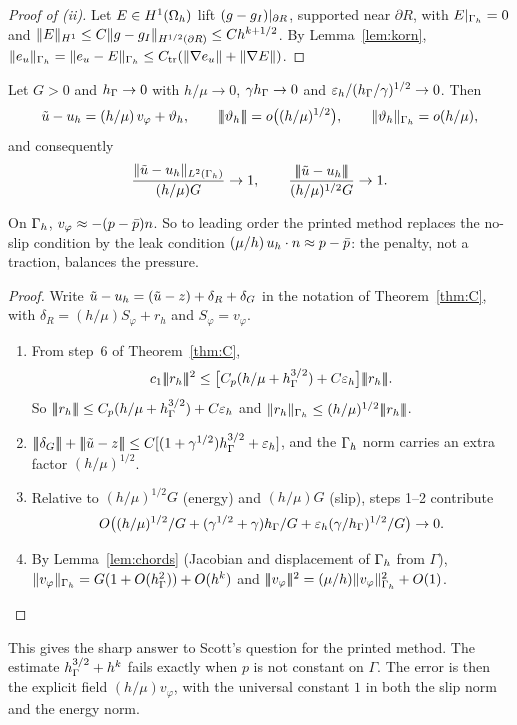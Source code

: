 \begin{proof}[Proof of (ii)]
Let $E\in H^1(\Omega_h)$ lift $(g-g_I)|_{\partial R}$, supported near $\partial R$, with $E|_{\Gamma_h}=0$ and $\lVert E\rVert_{H^1}\le C\lVert g-g_I\rVert_{H^{1/2}(\partial R)}\le Ch^{k+1/2}$. By Lemma~\ref{lem:korn}, $\lVert e_u\rVert_{\Gamma_h}=\lVert e_u-E\rVert_{\Gamma_h}\le C_{\mathrm{tr}}(\lVert \nabla e_u\rVert+\lVert \nabla E\rVert)$.
\end{proof}

\begin{corollary}\label{cor:Bp}
Let $G>0$ and $h_\Gamma\to0$ with $h/\mu\to0$, $\gamma h_\Gamma\to0$ and $\varepsilon_h/(h_\Gamma/\gamma)^{1/2}\to0$. Then
\[
\tilde u-u_h=(h/\mu)\,v_\varphi+\vartheta_h,\qquad |\!|\!|\vartheta_h|\!|\!|=o\bigl((h/\mu)^{1/2}\bigr),\qquad \lVert \vartheta_h\rVert_{\Gamma_h}=o(h/\mu),
\]
and consequently
\[
\frac{\lVert \tilde u-u_h\rVert_{L^2(\Gamma_h)}}{(h/\mu)G}\to1,\qquad\frac{|\!|\!|\tilde u-u_h|\!|\!|}{(h/\mu)^{1/2}G}\to1 .
\]
\end{corollary}

On $\Gamma_h$, $v_\varphi\approx-(p-\bar p)n$. So to leading order the printed method replaces the no-slip condition by the leak condition $(\mu/h)\,u_h\cdot n\approx p-\bar p$: the penalty, not a traction, balances the pressure.

\begin{proof}
Write $\tilde u-u_h=(\tilde u-z)+\delta_R+\delta_G$ in the notation of Theorem~\ref{thm:C}, with $\delta_R=(h/\mu)S_\varphi+r_h$ and $S_\varphi=v_\varphi$.
\begin{enumerate}
\item From step~6 of Theorem~\ref{thm:C},
\[
c_1\tnorm{r_h}^2\le\bigl[C_p(h/\mu+\hG^{3/2})+C\eps\bigr]\tnorm{r_h}.
\]
So $|\!|\!|r_h|\!|\!|\le C_p(h/\mu+h_\Gamma^{3/2})+C\varepsilon_h$ and $\lVert r_h\rVert_{\Gamma_h}\le(h/\mu)^{1/2}|\!|\!|r_h|\!|\!|$.
\item $\tnorm{\delta_G}+\tnorm{\ut-z}\le C[(1+\gamma^{1/2})\hG^{3/2}+\eps]$, and the $\Gamma_h$ norm carries an extra factor $(h/\mu)^{1/2}$.
\item Relative to $(h/\mu)^{1/2}G$ (energy) and $(h/\mu)G$ (slip), steps 1--2 contribute
\[
O\bigl((h/\mu)^{1/2}/G+(\gamma^{1/2}+\gamma)h_\Gamma/G+\varepsilon_h(\gamma/h_\Gamma)^{1/2}/G\bigr)\to0 .
\]
\item By Lemma~\ref{lem:chords} (Jacobian and displacement of $\Gamma_h$ from $\Gamma$), $\lVert v_\varphi\rVert_{\Gamma_h}=G(1+O(h_\Gamma^2))+O(h^k)$ and $|\!|\!|v_\varphi|\!|\!|^2=(\mu/h)\lVert v_\varphi\rVert^2_{\Gamma_h}+O(1)$.\qedhere
\end{enumerate}
\end{proof}

This gives the sharp answer to Scott's question for the printed method. The estimate $h_\Gamma^{3/2}+h^k$ fails exactly when $p$ is not constant on $\Gamma$. The error is then the explicit field $(h/\mu)v_\varphi$, with the universal constant $1$ in both the slip norm and the energy norm.


